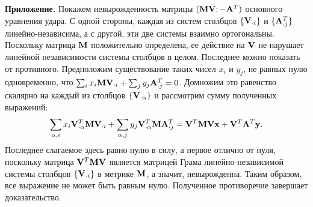 \textbf{Приложение.} Покажем невырожденность матрицы $(\mathbf{M}\mathbf{V}; -\mathbf{A}^T)$ основного уравнения удара.
С одной стороны, каждая из систем столбцов $\{\mathbf{V}_{\cdot i}\}$ и $\{\mathbf{A}^T_{\cdot j}\}$ линейно-независима,
а с другой, эти две системы взаимно ортогональны.
Поскольку матрица $\mathbf{M}$ положительно определена, ее действие на $\mathbf{V}$ не нарушает линейной независимости системы столбцов в целом.
Последнее можно показать от противного.
Предположим существование таких чисел $x_i$ и $y_j$, не равных нулю одновременно, что $\sum_i x_i \mathbf{M} \mathbf{V}_{\cdot i} + \sum_j y_j \mathbf{A}^T_{\cdot j} = 0$.
Домножим это равенство скалярно на каждый из столбцов $\{\mathbf{V}_{\cdot \alpha}\}$ и рассмотрим сумму полученных выражений:
$$
    \sum_{\alpha, i} x_i \mathbf{V}_{\cdot \alpha}^T \mathbf{M} \mathbf{V}_{\cdot i} + \sum_{\alpha, j} y_j \mathbf{V}_{\cdot \alpha}^T \mathbf{M} \mathbf{A}^T_{\cdot j} = \mathbf{V}^T \mathbf{M} \mathbf{V} \mathbf{x} + \mathbf{V}^T\mathbf{A}^T\mathbf{y}.
$$
Последнее слагаемое здесь равно нулю в силу,
а первое отлично от нуля, поскольку матрица $\mathbf{V}^T \mathbf{M} \mathbf{V}$ является матрицей Грама линейно-независимой системы столбцов $\{\mathbf{V}_{\cdot i}\}$ в метрике $\mathbf{M}$, а значит, невырожденна.
Таким образом, все выражение не может быть равным нулю.
Полученное противоречие завершает доказательство.